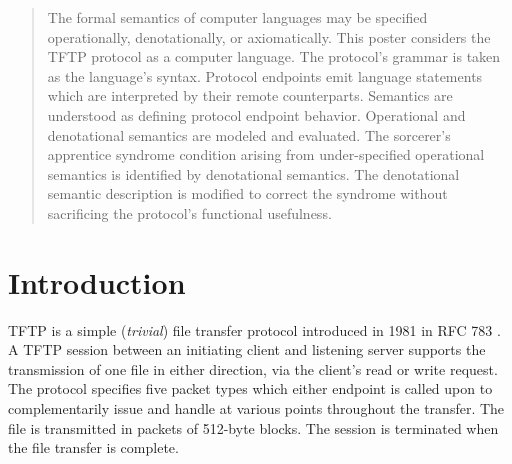 \documentclass[a0,landscape]{a0poster}
\begin{document}
\begin{multicols}{4} %


\color{Navy} %

\begin{abstract}

The formal semantics of computer languages may be specified operationally, denotationally, or axiomatically. This poster considers the TFTP protocol as a computer language. The protocol's grammar is taken as the language's syntax. Protocol endpoints emit language statements which are interpreted by their remote counterparts. Semantics are understood as defining protocol endpoint behavior. Operational and denotational semantics are modeled and evaluated. The sorcerer's apprentice syndrome condition arising from under-specified operational semantics is identified by denotational semantics. The denotational semantic description is modified to correct the syndrome without sacrificing the protocol's functional usefulness.

\end{abstract}


\color{SaddleBrown} %

\section*{Introduction}

TFTP is a simple (\textit{trivial}) file transfer protocol introduced in 1981 in RFC 783 \cite{Sollins:1983}.  A TFTP session between an initiating client and listening server supports the transmission of one file in either direction, via the client's read or write request. The protocol specifies five packet types which either endpoint is called upon to complementarily issue and handle at various points throughout the transfer. The file is transmitted in packets of 512-byte blocks. The session is terminated when the file transfer is complete.


\end{multicols}
\end{document}

